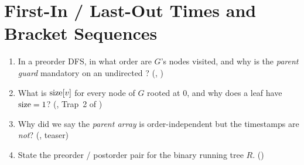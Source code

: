 \section{First-In / Last-Out Times and Bracket Sequences}\label{sec:c24-times}

\begin{previouslybox}
\begin{enumerate}[nosep, leftmargin=1.6em]
  \item In a preorder DFS, in what order are $G$'s nodes visited, and why is the
        \emph{parent guard} mandatory on an undirected ? (,
        )
  \item What is $\operatorname{size}[v]$ for every node of $G$ rooted at $0$, and why does a leaf have
        $\operatorname{size}=1$? (, Trap~2 of )
  \item Why did we say the \emph{parent array} is order-independent but the timestamps are
        \emph{not}? (,  teaser)
  \item State the preorder / postorder pair for the binary running tree $R$. ()
\end{enumerate}
\end{previouslybox}

